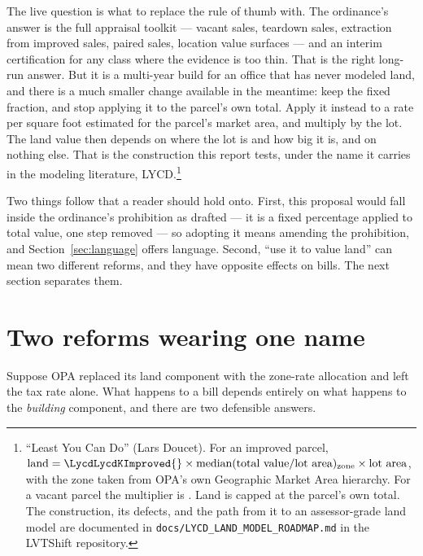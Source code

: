 \documentclass[11pt]{article}
\begin{document}
The live question is what to replace the rule of thumb with. The ordinance's answer is the
full appraisal toolkit --- vacant sales, teardown sales, extraction from improved sales, paired
sales, location value surfaces --- and an interim certification for any class where the
evidence is too thin. That is the right long-run answer. But it is a multi-year build for an
office that has never modeled land, and there is a much smaller change available in the
meantime: keep the fixed fraction, and stop applying it to the parcel's own total. Apply it
instead to a rate per square foot estimated for the parcel's market area, and multiply by the
lot. The land value then depends on where the lot is and how big it is, and on nothing else.
That is the construction this report tests, under the name it carries in the modeling
literature, LYCD.\footnote{``Least You Can Do'' (Lars Doucet). For an improved parcel,
$\text{land} = \LycdLycdKImproved{} \times \text{median}(\text{total value}/\text{lot area})_{\text{zone}} \times \text{lot area}$,
with the zone taken from OPA's own Geographic Market Area hierarchy. For a vacant parcel the
multiplier is \LycdLycdKVacant{}. Land is capped at the parcel's own total. The construction,
its defects, and the path from it to an assessor-grade land model are documented in
\texttt{docs/LYCD\_LAND\_MODEL\_ROADMAP.md} in the LVTShift repository.}

Two things follow that a reader should hold onto. First, this proposal would fall inside the
ordinance's prohibition as drafted --- it is a fixed percentage applied to total value, one
step removed --- so adopting it means amending the prohibition, and Section~\ref{sec:language}
offers language. Second, ``use it to value land'' can mean two different reforms, and they
have opposite effects on bills. The next section separates them.

\section{Two reforms wearing one name}\label{sec:readings}

Suppose OPA replaced its land component with the zone-rate allocation and left the tax rate
alone. What happens to a bill depends entirely on what happens to the \emph{building}
component, and there are two defensible answers.
\end{document}
